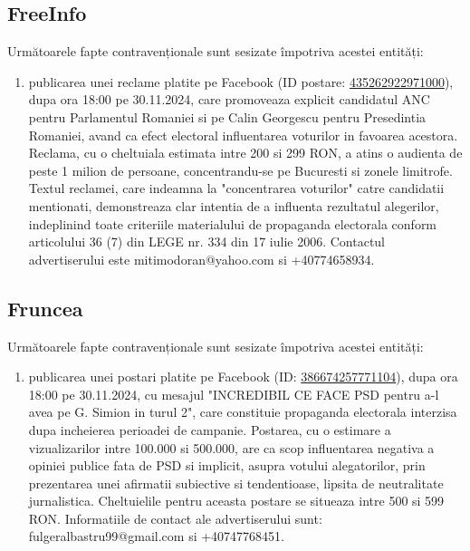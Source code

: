 \documentclass[a4paper,12pt]{article}
\begin{document}
\vspace{0.5cm}

\subsection{FreeInfo}
Următoarele fapte contravenționale sunt sesizate împotriva acestei entități:

\begin{enumerate}[leftmargin=*, label=\arabic*.)]
    \item publicarea unei reclame platite pe Facebook (ID postare: \href{https://www.facebook.com/ads/library/?id=435262922971000}{435262922971000}), dupa ora 18:00 pe 30.11.2024, care promoveaza explicit candidatul ANC pentru Parlamentul Romaniei si pe Calin Georgescu pentru Presedintia Romaniei, avand ca efect electoral influentarea voturilor in favoarea acestora.  Reclama, cu o cheltuiala estimata intre 200 si 299 RON, a atins o audienta de peste 1 milion de persoane, concentrandu-se pe Bucuresti si zonele limitrofe.  Textul reclamei, care indeamna la "concentrarea voturilor" catre candidatii mentionati, demonstreaza clar intentia de a influenta rezultatul alegerilor, indeplinind toate criteriile materialului de propaganda electorala conform articolului 36 (7) din LEGE nr. 334 din 17 iulie 2006.  Contactul advertiserului este mitimodoran@yahoo.com si +40774658934.
\end{enumerate}

\vspace{0.5cm}

\subsection{Fruncea}
Următoarele fapte contravenționale sunt sesizate împotriva acestei entități:

\begin{enumerate}[leftmargin=*, label=\arabic*.)]
    \item publicarea unei postari platite pe Facebook (ID: \href{https://www.facebook.com/ads/library/?id=386674257771104}{386674257771104}), dupa ora 18:00 pe 30.11.2024, cu mesajul "INCREDIBIL CE FACE PSD pentru a-l avea pe G. Simion in turul 2",  care constituie propaganda electorala interzisa dupa incheierea perioadei de campanie.  Postarea, cu o estimare a vizualizarilor intre 100.000 si 500.000, are ca scop influentarea negativa a opiniei publice fata de PSD si implicit, asupra votului alegatorilor, prin prezentarea unei afirmatii subiective si tendentioase, lipsita de neutralitate jurnalistica.  Cheltuielile pentru aceasta postare se situeaza intre 500 si 599 RON.  Informatiile de contact ale advertiserului sunt: fulgeralbastru99@gmail.com si +40747768451.
\end{enumerate}
\end{document}
